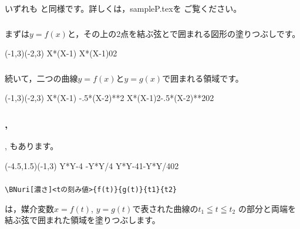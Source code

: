 いずれも  と同様です。詳しくは，\textsf{sampleP.tex}を
ご覧ください。

\subsubsection{}
まずは$y=f(x)$と，その上の2点を結ぶ弦とで囲まれる図形の塗りつぶしです。

\begin{showEx}{}
\begin{zahyou}[ul=10mm](-1,3)(-2,3)
  \zahyouMemori[g]
  \def\Fx{X*(X-1)}
  \YGurafu*\Fx
  \YNuri\Fx{0}{2}
\end{zahyou}
\end{showEx}

\subsubsection{}
続いて，二つの曲線$y=f(x)$と$y=g(x)$で囲まれる領域です。

\begin{showEx}{}
\begin{zahyou}[ul=10mm](-1,3)(-2,3)
  \zahyouMemori[g]
  \def\Fx{X*(X-1)}
  \def\Gx{2-.5*(X-2)**2}
  \YGurafu*\Fx
  \YGurafu*\Gx
  \YNurii[.8]\Fx\Gx{0}{2}
\end{zahyou}
\end{showEx}


\subsubsection{, }
, もあります。

\begin{showEx}{}
\begin{zahyou}[ul=10mm](-4.5,1.5)(-1,3)
  \zahyouMemori[g]
  \def\Fy{Y*Y-4}
  \def\Gy{1-Y*Y/4}
  \XGurafu*[sitay=0]\Fy
  \XGurafu*[sitay=0]\Gy
  \XNurii\Fy\Gy{0}{2}
\end{zahyou}
\end{showEx}

\subsubsection{}
\begin{boxnote}
\begin{verbatim}
\BNuri[濃さ]<tの刻み値>{f(t)}{g(t)}{t1}{t2}
\end{verbatim}
\end{boxnote}
\noindent
は，媒介変数$x=f(t)$, $y=g(t)$で表された曲線の$t_1\leqq t\leqq t_2$
の部分と両端を結ぶ弦で囲まれた領域を塗りつぶします。

